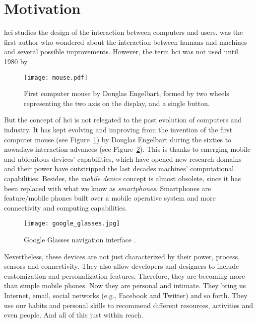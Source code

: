 \section{Motivation}
\label{sec:motivation}

\ac{hci} studies the design of the interaction between computers and users. 
\citet{carlisle1976evaluating} was the first author who wondered about the 
interaction between humans and machines and several possible improvements. 
However, the term \ac{hci} was not used until 1980 by~\citet{card1980keystroke}.


\begin{figure}[H]
\centering
\texttt{[image: mouse.pdf]}
\caption{First computer mouse by Douglas Engelbart, formed by two wheels 
representing the two axis on the display, and a single button.}
\label{fig:mouse}
\end{figure}

But the concept of \ac{hci} is not relegated to the past evolution of computers 
and industry. It has kept evolving and improving from the invention of the first
computer mouse (see Figure~\ref{fig:mouse}) by Douglas Engelbart during the 
sixties to nowadays interaction advances (see Figure~\ref{fig:google_glasses}).
This is thanks to emerging mobile and ubiquitous devices' capabilities, which
have opened new research domains and their power have outstripped the last
decades machines' computational capabilities. Besides, the \textit{mobile device}
concept is almost obsolete, since it has been replaced with what we know as
\textit{smartphones}. Smartphones are feature/mobile phones built over a mobile
operative system and more connectivity and computing capabilities. 

\begin{figure}[H]
\centering
\texttt{[image: google\_glasses.jpg]}
\caption{Google Glasses navigation interface \citep{google_glasses}.}
\label{fig:google_glasses}
\end{figure}

Nevertheless, these devices are not just characterized by their power, process,
sensors and connectivity. They also allow developers and designers to include
customization and personalization features. Therefore, they are becoming more
than simple mobile phones. Now they are personal and intimate. They bring us
Internet, email, social networks (e.g., Facebook and Twitter) and so forth. They use
our habits and personal skills to recommend different resources, activities and
even people. And all of this just within reach.

